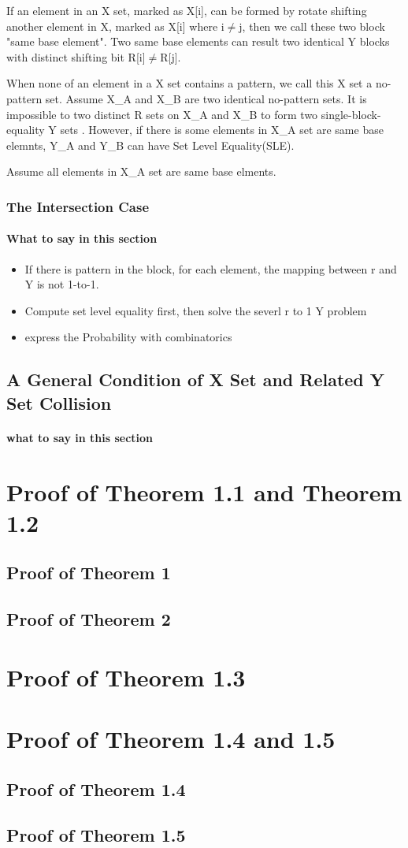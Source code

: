 \documentclass{article}
\begin{document}
If an element in an X set, marked as X[i], can be formed by rotate shifting another element in X, marked as X[i] where i$\neq$j, then we call these two block "same base element". Two same base elements can result two identical Y blocks with distinct shifting bit R[i]$\neq$R[j]. 

When none of an element in a X set contains a pattern, we call this X set a no-pattern set. Assume X\_A and X\_B are two identical no-pattern sets. It is impossible to two distinct R sets on X\_A and X\_B to form two single-block-equality Y sets . However, if there is some elements in X\_A set are same base elemnts, Y\_A and Y\_B can have Set Level Equality(SLE). 

Assume all elements in X\_A set are same base elments. 



\subsubsection{The Intersection Case}
\paragraph{What to say in this section}
\begin{itemize}
	\item If there is pattern in the block, for each element, the mapping between r and Y is not 1-to-1.
	\item Compute set level equality first, then solve the severl r to 1 Y problem
	\item express the Probability with combinatorics
\end{itemize}

\subsection{A General Condition of X Set and Related Y Set Collision}
\paragraph{what to say in this section}


\appendix
\section{Proof of Theorem 1.1 and Theorem 1.2}
\subsection{Proof of Theorem 1}
\subsection{Proof of Theorem 2}
\section{Proof of Theorem 1.3}
\section{Proof of Theorem 1.4 and 1.5}
\subsection{Proof of Theorem 1.4}
\subsection{Proof of Theorem 1.5}
\end{document}
